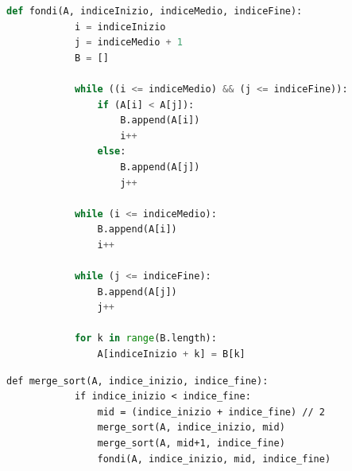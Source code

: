 \documentclass[12pt]{report}
\begin{document}
    \begin{lstlisting}[language=Python, caption={Funzione di appoggio per la fusione}]
    	def fondi(A, indiceInizio, indiceMedio, indiceFine):
    		i = indiceInizio
    		j = indiceMedio + 1
    		B = []
    		
    		while ((i <= indiceMedio) && (j <= indiceFine)):
    			if (A[i] < A[j]):
    				B.append(A[i])
    				i++
    			else:
    				B.append(A[j])
    				j++
    		
    		while (i <= indiceMedio):
    			B.append(A[i])
    			i++
    		
    		while (j <= indiceFine):
    			B.append(A[j])
    			j++
    		
    		for k in range(B.length):
    			A[indiceInizio + k] = B[k]
    \end{lstlisting}
    
    \begin{lstlisting}[caption={Merge Sort}]
    	def merge_sort(A, indice_inizio, indice_fine):
    		if indice_inizio < indice_fine:
    			mid = (indice_inizio + indice_fine) // 2
    			merge_sort(A, indice_inizio, mid)
    			merge_sort(A, mid+1, indice_fine)
    			fondi(A, indice_inizio, mid, indice_fine)
    \end{lstlisting}
    
\end{document}
